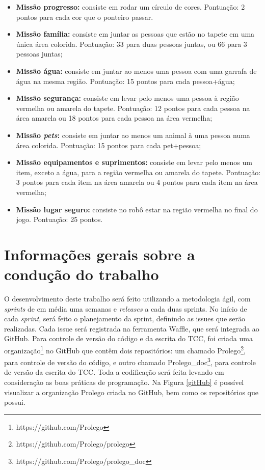 \begin{itemize}
\item \textbf{Missão progresso:} consiste em rodar um círculo de cores. Pontuação: 2 pontos para cada cor que o ponteiro passar.
\item \textbf{Missão família:} consiste em juntar as pessoas que estão no tapete em uma única área colorida. Pontuação: 33 para duas pessoas juntas, ou 66 para 3 pessoas juntas;
\item \textbf{Missão água:} consiste em juntar ao menos uma pessoa com uma garrafa de água na mesma região. Pontuação: 15 pontos para cada pessoa+água;
\item \textbf{Missão segurança:} consiste em levar pelo menos uma pessoa à região vermelha ou amarela do tapete. Pontuação: 12 pontos para cada pessoa na área amarela ou 18 pontos para cada pessoa na área vermelha;
\item \textbf{Missão \textit{pets}:} consiste em juntar ao menos um animal à uma pessoa numa área colorida. Pontuação: 15 pontos para cada pet+pessoa;
\item \textbf{Missão equipamentos e suprimentos:} consiste em levar pelo menos um item, exceto a água, para a região vermelha ou amarela do tapete. Pontuação: 3 pontos para cada item na área amarela ou 4 pontos para cada item na área vermelha;
\item \textbf{Missão lugar seguro:} consiste no robô estar na região vermelha no final do jogo. Pontuação: 25 pontos. 
\end{itemize}

\section{Informações gerais sobre a condução do trabalho}
O desenvolvimento deste trabalho será feito utilizando a metodologia ágil, com \textit{sprints} de em média uma semanas e \textit{releases} a cada duas sprints. No início de cada \textit{sprint}, será feito o planejamento da sprint, definindo as issues que serão realizadas. Cada issue será registrada na ferramenta Waffle, que será integrada ao GitHub.
Para controle de versão do código e da escrita do TCC, foi criada uma organização\footnote{https://github.com/Prolego} no GitHub que contêm dois repositórios: um chamado Prolego\footnote{https://github.com/Prolego/prolego}, para controle de versão do código, e outro chamado Prolego\_doc\footnote{https://github.com/Prolego/prolego\_doc}, para controle de versão da escrita do TCC. Toda a codificação será feita levando em consideração as boas práticas de programação. Na Figura \ref{gitHub} é possível visualizar a organização Prolego criada no GitHub, bem como os repositórios que possui.

